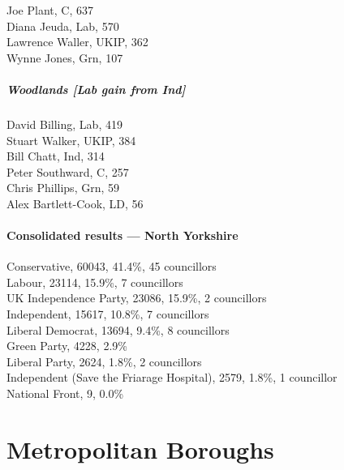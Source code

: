 \documentclass[a4paper,openany,10pt]{book}
\begin{document}


Joe Plant, C, 637\\
Diana Jeuda, Lab, 570\\
Lawrence Waller, UKIP, 362\\
Wynne Jones, Grn, 107\\


\subsubsection*{Woodlands \hspace*{\fill}\nolinebreak[1]%
\enspace\hspace*{\fill}
[Lab gain from Ind]}



David Billing, Lab, 419\\
Stuart Walker, UKIP, 384\\
Bill Chatt, Ind, 314\\
Peter Southward, C, 257\\
Chris Phillips, Grn, 59\\
Alex Bartlett-Cook, LD, 56\\




\subsection*{Consolidated results --- North Yorkshire}
Conservative, 60043, 41.4\%, 45 councillors\\
Labour, 23114, 15.9\%, 7 councillors\\
UK Independence Party, 23086, 15.9\%, 2 councillors\\
Independent, 15617, 10.8\%, 7 councillors\\
Liberal Democrat, 13694, 9.4\%, 8 councillors\\
Green Party, 4228, 2.9\% \\
Liberal Party, 2624, 1.8\%, 2 councillors\\
Independent (Save the Friarage Hospital), 2579, 1.8\%, 1 councillor\\
National Front, 9, 0.0\% \\


\part{Metropolitan Boroughs}
\end{document}

